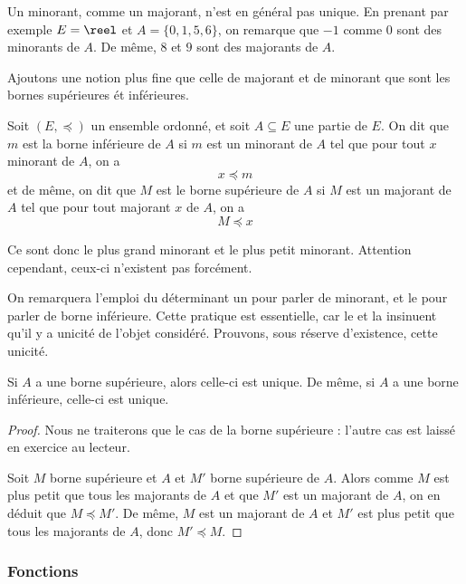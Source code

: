 \begin{rmk}
    Un minorant, comme un majorant, n'est en général pas unique. En prenant par exemple $E=\reel$ et $A=\{0,1,5,6\}$, on remarque que $-1$ comme $0$ sont des minorants de $A$. De même, $8$ et $9$ sont des majorants de $A$.
\end{rmk}

Ajoutons une notion plus fine que celle de majorant et de minorant que sont les bornes supérieures ét inférieures.

\begin{defi}
    Soit $(E,\preceq)$ un ensemble ordonné, et soit $A\subseteq E$ une partie de $E$. On dit que $m$ est la borne inférieure de $A$ si $m$ est un minorant de $A$ tel que pour tout $x$ minorant de $A$, on a $$x\preceq m$$ et de même, on dit que $M$ est le borne supérieure de $A$ si $M$ est un majorant de $A$ tel que pour tout majorant $x$ de $A$, on a $$M\preceq x$$
    
    Ce sont donc le plus grand minorant et le plus petit minorant. Attention cependant, ceux-ci n'existent pas forcément.
\end{defi}

On remarquera l'emploi du déterminant \og un\fg{} pour parler de minorant, et \og le\fg{} pour parler de borne inférieure. Cette pratique est essentielle, car \og le\fg{} et \og la\fg{} insinuent qu'il y a unicité de l'objet considéré. Prouvons, sous réserve d'existence, cette unicité.

\begin{prop}
    Si $A$ a une borne supérieure, alors celle-ci est unique. De même, si $A$ a une borne inférieure, celle-ci est unique.
\end{prop}
\begin{proof}
    Nous ne traiterons que le cas de la borne supérieure : l'autre cas est laissé en exercice au lecteur.
    
    Soit $M$ borne supérieure et $A$ et $M'$ borne supérieure de $A$. Alors comme $M$ est plus petit que tous les majorants de $A$ et que $M'$ est un majorant de $A$, on en déduit que \underline{$M\preceq M'$}. De même, $M$ est un majorant de $A$ et $M'$ est plus petit que tous les majorants de $A$, donc \underline{$M'\preceq M$}.
    
\end{proof}

\subsubsection{Fonctions}


